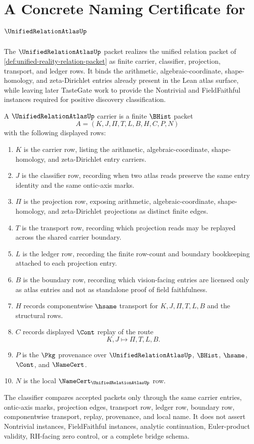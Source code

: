 \chapter{A Concrete Naming Certificate for $\UnifiedRelationAtlasUp$}
\label{ch:concrete-instances-unified-relation-atlas-namecert}

The $\UnifiedRelationAtlasUp$ packet realizes the unified relation packet of \autoref{def:unified-reality-relation-packet} as finite carrier, classifier, projection, transport, and ledger rows. It binds the arithmetic, algebraic-coordinate, shape-homology, and zeta-Dirichlet entries already present in the Lean atlas surface, while leaving later TasteGate work to provide the Nontrivial and FieldFaithful instances required for positive discovery classification.

\begin{definition}
\label{def:unified-relation-atlas-carrier}
A $\UnifiedRelationAtlasUp$ carrier is a finite $\BHist$ packet
$$
A=(K,J,\Pi,T,L,B,H,C,P,N)
$$
with the following displayed rows:
\begin{enumerate}
\item $K$ is the carrier row, listing the arithmetic, algebraic-coordinate, shape-homology, and zeta-Dirichlet entry carriers.
\item $J$ is the classifier row, recording when two atlas reads preserve the same entry identity and the same ontic-axis marks.
\item $\Pi$ is the projection row, exposing arithmetic, algebraic-coordinate, shape-homology, and zeta-Dirichlet projections as distinct finite edges.
\item $T$ is the transport row, recording which projection reads may be replayed across the shared carrier boundary.
\item $L$ is the ledger row, recording the finite row-count and boundary bookkeeping attached to each projection entry.
\item $B$ is the boundary row, recording which vision-facing entries are licensed only as atlas entries and not as standalone proof of field faithfulness.
\item $H$ records componentwise $\hsame$ transport for $K,J,\Pi,T,L,B$ and the structural rows.
\item $C$ records displayed $\Cont$ replay of the route
$$
K,J \longmapsto \Pi,T,L,B .
$$
\item $P$ is the $\Pkg$ provenance over $\UnifiedRelationAtlasUp$, $\BHist$, $\hsame$, $\Cont$, and $\NameCert$.
\item $N$ is the local $\NameCert_{\UnifiedRelationAtlasUp}$ row.
\end{enumerate}
The classifier compares accepted packets only through the same carrier entries, ontic-axis marks, projection edges, transport row, ledger row, boundary row, componentwise transport, replay, provenance, and local name. It does not assert Nontrivial instances, FieldFaithful instances, analytic continuation, Euler-product validity, RH-facing zero control, or a complete bridge schema.
\end{definition}

